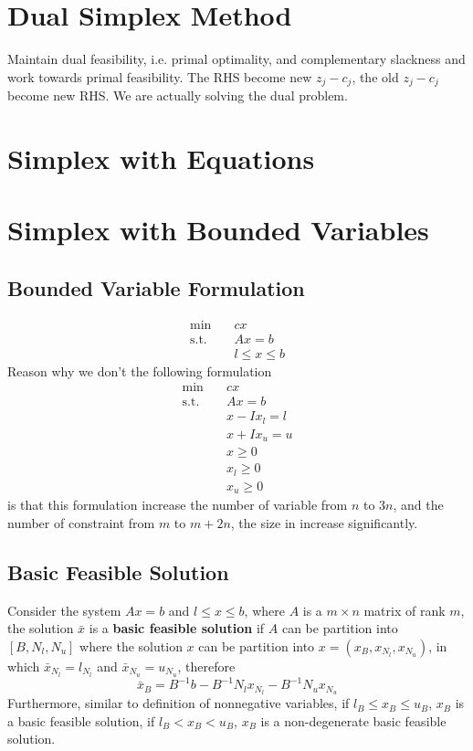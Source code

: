 			\section{Dual Simplex Method}
				Maintain dual feasibility, i.e. primal optimality, and complementary slackness and work towards primal feasibility.
				The RHS become new $z_j - c_j$, the old $z_j - c_j$ become new RHS. We are actually solving the dual problem.

			\section{Simplex with Equations}

			\section{Simplex with Bounded Variables}
				\subsection{Bounded Variable Formulation}
					\begin{align}
						\min \quad & cx \\
						\text{s.t.} \quad & Ax=b \\
										  & l \le x\le b 
					\end{align}
					Reason why we don't the following formulation
					\begin{align}
						\min \quad & cx \\
						\text{s.t.} \quad & Ax=b \\
						                  & x - Ix_l = l \\
						                  & x + Ix_u = u \\
						                  & x \ge 0\\
						                  & x_l \ge 0\\
						                  & x_u \ge 0 
					\end{align}
					is that this formulation increase the number of variable from $n$ to $3n$, and the number of constraint from $m$ to $m+2n$, the size in increase significantly.

				\subsection{Basic Feasible Solution}
					Consider the system $Ax=b$ and $l\le x\le b$, where $A$ is a $m\times n$ matrix of rank $m$, the solution $\bar{x}$ is a \textbf{basic feasible solution} if $A$ can be partition into $[B, N_l, N_u]$ where the solution $x$ can be partition into $x=(x_B, x_{N_l}, x_{N_u})$, in which $\bar{x}_{N_l} = l_{N_l}$ and $\bar{x}_{N_u} = u_{N_u}$, therefore
					\begin{equation}
						\bar{x}_B = B^{-1}b - B^{-1}N_lx_{N_l} - B^{-1}N_ux_{N_u} 
					\end{equation}
					Furthermore, similar to definition of nonnegative variables, if $l_B \le x_B \le u_B$, $x_B$ is a basic feasible solution, if $l_B < x_B < u_B$, $x_B$ is a non-degenerate basic feasible solution. 

